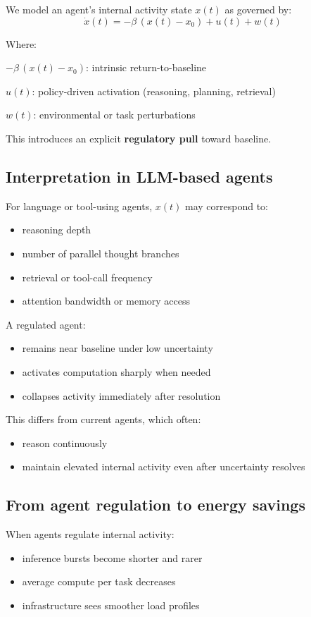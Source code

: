 \documentclass[11pt]{article}
\begin{document}
We model an agent’s internal activity state \(x(t)\) as governed by:
\[
\dot{x}(t)=-\beta\,(x(t)-x_{0}) + u(t) + w(t)
\]

Where:

\(-\beta\,(x(t)-x_0)\): intrinsic return-to-baseline

\(u(t)\): policy-driven activation (reasoning, planning, retrieval)

\(w(t)\): environmental or task perturbations

This introduces an explicit \textbf{regulatory pull} toward baseline.

\subsection{Interpretation in LLM-based agents}
For language or tool-using agents, \(x(t)\) may correspond to:

\begin{itemize}
\item reasoning depth
\item number of parallel thought branches
\item retrieval or tool-call frequency
\item attention bandwidth or memory access
\end{itemize}

A regulated agent:

\begin{itemize}
\item remains near baseline under low uncertainty
\item activates computation sharply when needed
\item collapses activity immediately after resolution
\end{itemize}

This differs from current agents, which often:

\begin{itemize}
\item reason continuously
\item maintain elevated internal activity even after uncertainty resolves
\end{itemize}

\subsection{From agent regulation to energy savings}
When agents regulate internal activity:

\begin{itemize}
\item inference bursts become shorter and rarer
\item average compute per task decreases
\item infrastructure sees smoother load profiles
\end{itemize}
\end{document}
